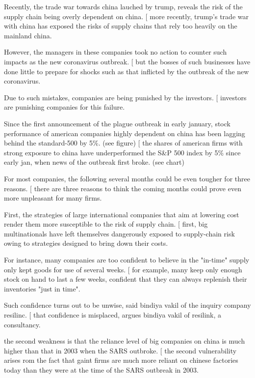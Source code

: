 \documentclass[a4paper,10pt]{article}
\begin{document}
{{{{{{{Recently, the trade war towards china lauched by trump, reveals the risk of
the supply chain being overly dependent on china.
[
	more recently, trump's trade war with china has exposed the risks of supply chains
	that rely too heavily on the mainland china.

However, the managers in these companies took no action to counter such impacts
as the new coronavirus outbreak.
[
	but the bosses of such businesses have done little to prepare for shocks such as
	that inflicted by the outbreak of the new coronavirus.


Due to such mistakes, companies are being punished by the investors.
[
	investors are punishing companies for this failure.

Since the first announcement of the plague outbreak in early january, stock performance of american companies highly dependent on china has been
lagging behind the standard-500 by 5\%. (see figure)
[
	the shares of american firms with strong exposure to china have underperformed the S\&P 500 index by 5\% since early jan,
	when news of the outbreak first broke. (see chart)


For most companies, the following several months could be even tougher for three reasons.
[
	there are three reasons to think the coming months could prove even more unpleasant for many firms.

First, the strategies of large international companies that aim at lowering cost render
them more susceptible to the risk of supply chain.
[
	first, big multinationals have left themselves dangerously exposed to supply-chain risk owing to
	strategies designed to bring down their costs.

For instance, many companies are too confident to believe in the "in-time" supply
only kept goods for use of several weeks.
[
	for example, many keep only enough stock on hand to last a few weeks, confident
	that they can always replenish their inventories "just in time".

Such confidence turns out to be unwise, said bindiya vakil of the inquiry company resilinc.
[
	that confidence is misplaced, argues bindiya vakil of resilink, a consultancy.

%

the second weakness is that the reliance level of big companies on china is much higher than that in 2003 when the SARS outbroke.
[
	the second vulnerability arises rom the fact that gaint firms are much more reliant on chinese factories today than they were at the
	time of the SARS outbreak in 2003.

}}}}}}}
\end{document}

